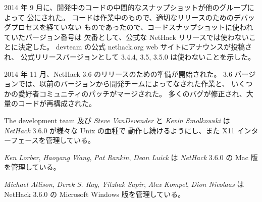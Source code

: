 \medskip
2014 年 9 月に、開発中のコードの中間的なスナップショットが他のグループによって
公にされた。
コードは作業中のもので、適切なリリースのためのデバッグプロセスを経ていない
ものであったので、コードスナップショットに使われていたバージョン番号は
欠番として、公式な NetHack リリースでは使わないことに決定した。
devteam の公式 nethack.org web サイトにアナウンスが投稿され、
公式リリースバージョンとして 3.4.4, 3.5, 3.5.0 は使わないことを示した。

\medskip
2014 年 11 月、NetHack 3.6 のリリースのための準備が開始された。
3.6 バージョンでは、以前のバージョンから開発チームによってなされた作業と、
いくつかの愛好者コミュニティのパッチがマージされた。
多くのバグが修正され、大量のコードが再構成された。


\medskip
The development team 及び {\it Steve VanDevender} と
{\it Kevin Smolkowski} は {\it NetHack\/} 3.6.0 が様々な Unix の亜種で
動作し続けるようにし、また X11 インターフェースを管理している。

{\it Ken Lorber}, {\it Haoyang Wang}, {\it Pat Rankin}, {\it Dean Luick} は
{\it NetHack\/} 3.6.0 の Mac 版を管理している。

\medskip
{\it Michael Allison}, {\it Derek S. Ray}, {\it Yitzhak Sapir}, 
{\it Alex Kompel}, {\it Dion Nicolaas} は NetHack 3.6.0 の
Microsoft Windows 版を管理している。

